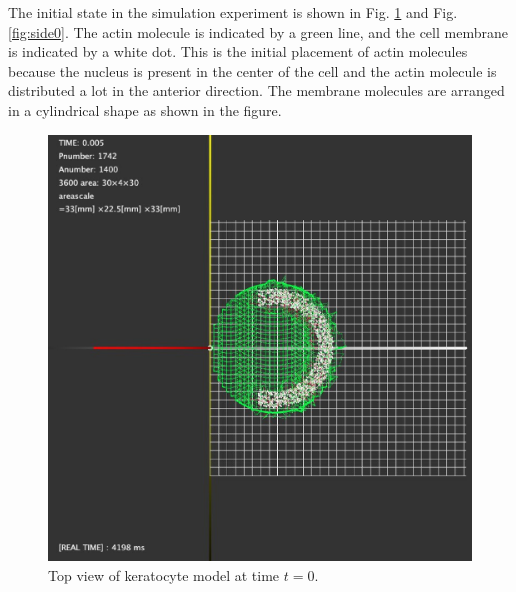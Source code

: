 \documentclass[a4paper,12pt]{book}
\begin{document}
The initial state in the simulation experiment is shown in Fig. \ref{fig:top0} and Fig. \ref{fig:side0}. The actin molecule is indicated by a green line, and the cell membrane is indicated by a white dot. This is the initial placement of actin molecules because the nucleus is present in the center of the cell and the actin molecule is distributed a lot in the anterior direction. The membrane molecules are arranged in a cylindrical shape as shown in the figure.
\begin{figure}[tbp]
\centering
\includegraphics[scale=0.25]{top.eps}
\caption{Top view of keratocyte model at time $t=0$.}
\label{fig:top0}
\end{figure}
\end{document}
